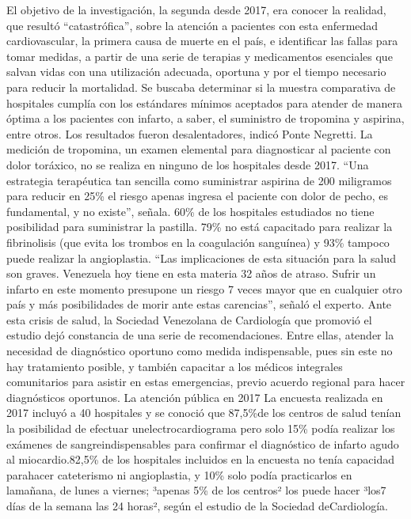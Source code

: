 \documentclass{article}%
\begin{document}
\newline%
%
El objetivo de la investigación, la segunda desde 2017, era conocer la realidad, que resultó “catastrófica”, sobre la atención a pacientes con esta enfermedad cardiovascular, la primera causa de muerte en el país, e identificar las fallas para tomar medidas, a partir de una serie de terapias y medicamentos esenciales que salvan vidas con una utilización adecuada, oportuna y por el tiempo necesario para reducir la mortalidad. Se buscaba determinar si la muestra comparativa de hospitales cumplía con los estándares mínimos aceptados para atender de manera óptima a los pacientes con infarto, a saber, el suministro de tropomina y aspirina, entre otros. Los resultados fueron desalentadores, indicó Ponte Negretti.%
\newline%
%
La medición de tropomina, un examen elemental para diagnosticar al paciente con dolor toráxico, no se realiza en ninguno de los hospitales desde 2017.%
\newline%
%
“Una estrategia terapéutica tan sencilla como suministrar aspirina de 200 miligramos para reducir en 25\% el riesgo apenas ingresa el paciente con dolor de pecho, es fundamental, y no existe”, señala. 60\% de los hospitales estudiados no tiene posibilidad para suministrar la pastilla. 79\% no está capacitado para realizar la fibrinolisis (que evita los trombos en la coagulación sanguínea) y 93\% tampoco puede realizar la angioplastia.%
\newline%
%
“Las implicaciones de esta situación para la salud son graves. Venezuela hoy tiene en esta materia 32 años de atraso. Sufrir un infarto en este momento presupone un riesgo 7 veces mayor que en cualquier otro país y más posibilidades de morir ante estas carencias”, señaló el experto.%
\newline%
%
Ante esta crisis de salud, la Sociedad Venezolana de Cardiología que promovió el estudio dejó constancia de una serie de recomendaciones. Entre ellas, atender la necesidad de diagnóstico oportuno como medida indispensable, pues sin este no hay tratamiento posible, y también capacitar a los médicos integrales comunitarios para asistir en estas emergencias, previo acuerdo regional para hacer diagnósticos oportunos.%
\newline%
%
La atención pública en 2017%
\newline%
%
La encuesta realizada en 2017 incluyó a 40 hospitales y se conoció que 87,5\%de los centros de salud tenían la posibilidad de efectuar unelectrocardiograma pero solo 15\% podía realizar los exámenes de sangreindispensables para confirmar el diagnóstico de infarto agudo al miocardio.82,5\% de los hospitales incluidos en la encuesta no tenía capacidad parahacer cateterismo ni angioplastia, y 10\% solo podía practicarlos en lamañana, de lunes a viernes; ³apenas 5\% de los centros² los puede hacer ³los7 días de la semana las 24 horas², según el estudio de la Sociedad deCardiología.%
\newline%
%
\end{document}
